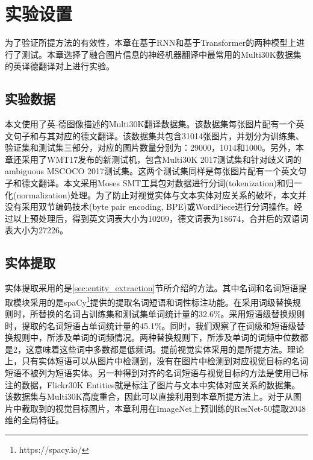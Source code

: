 \section{实验设置}
为了验证所提方法的有效性，本章在基于RNN和基于Transformer的两种模型上进行了测试。本章选择了融合图片信息的神经机器翻译中最常用的Multi30K\cite{43_elliott-etal-2016-multi30k}数据集的英译德翻译对上进行实验。

\subsection{实验数据}
本文使用了英-德图像描述的Multi30K翻译数据集。该数据集每张图片配有一个英文句子和与其对应的德文翻译。该数据集共包含31014张图片，并划分为训练集、验证集和测试集三部分，对应的图片数量分别为：29000，1014和1000。另外，本章还采用了WMT17发布的新测试机，包含Multi30K 2017测试集和针对歧义词的ambiguous MSCOCO 2017测试集。这两个测试集同样是每张图片配有一个英文句子和德文翻译。本文采用Moses SMT\cite{44_koehn-etal-2007-moses}工具包对数据进行分词(tokenization)和归一化(normalization)处理。为了防止对视觉实体与文本实体对应关系的破坏，本文并没有采用双节编码技术\cite{27_sennrich-etal-2016-neural}(byte pair encoding, BPE)或WordPiece\cite{28_DBLP:journals/corr/WuSCLNMKCGMKSJL16}进行分词操作。经过以上预处理后，得到英文词表大小为10209，德文词表为18674，合并后的双语词表大小为27226。

\subsection{实体提取}
实体提取采用的是\ref{sec:entity_extraction}节所介绍的方法。其中名词和名词短语提取模块采用的是spaCy\footnote{https://spacy.io/}提供的提取名词短语和词性标注功能。在采用词级替换规则时，所替换的名词占训练集和测试集单词统计量的32.6\%。采用短语级替换规则时，提取的名词短语占单词统计量的45.1\%。同时，我们观察了在词级和短语级替换规则中，所涉及单词的词频情况。两种替换规则下，所涉及单词的词频中位数都是2，这意味着这些词中多数都是低频词。提前视觉实体采用的是\cite{24_DBLP:conf/iccv/YangGWHYL19}所提方法。理论上，只有实体短语可以从图片中检测到，没有在图片中检测到对应视觉目标的名词短语不被列为短语实体。另一种得到对齐的名词短语与视觉目标的方法是使用已标注的数据，Flickr30K Entities\cite{29_DBLP:conf/iccv/PlummerWCCHL15,30_DBLP:journals/ijcv/PlummerWCCHL17}就是标注了图片与文本中实体对应关系的数据集。该数据集与Multi30K高度重合，因此可以直接利用到本章所提方法上。对于从图片中截取到的视觉目标图片，本章利用在ImageNet\cite{31_DBLP:journals/ijcv/RussakovskyDSKS15}上预训练的ResNet-50\cite{32_DBLP:conf/cvpr/HeZRS16}提取2048维的全局特征。

